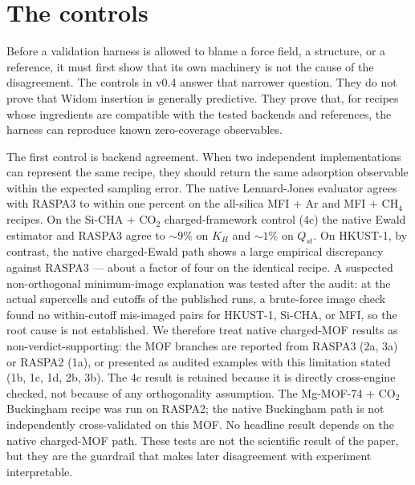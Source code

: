\section{The controls}\label{sec:controls}

Before a validation harness is allowed to blame a force field, a structure, or a reference, it must first show that its own machinery is not the cause of the disagreement. The controls in v0.4 answer that narrower question. They do not prove that Widom insertion is generally predictive. They prove that, for recipes whose ingredients are compatible with the tested backends and references, the harness can reproduce known zero-coverage observables.

The first control is backend agreement. When two independent implementations can represent the same recipe, they should return the same adsorption observable within the expected sampling error. The native Lennard-Jones evaluator agrees with RASPA3 to within one percent on the all-silica MFI + Ar and MFI + CH\(_4\) recipes. On the Si-CHA + CO\(_2\) charged-framework control (4c) the native Ewald estimator and RASPA3 agree to \(\sim\!9\%\) on \(K_H\) and \(\sim\!1\%\) on \(Q_{st}\). On HKUST-1, by contrast, the native charged-Ewald path shows a large empirical discrepancy against RASPA3 --- about a factor of four on the identical recipe. A suspected non-orthogonal minimum-image explanation was tested after the audit: at the actual supercells and cutoffs of the published runs, a brute-force image check found no within-cutoff mis-imaged pairs for HKUST-1, Si-CHA, or MFI, so the root cause is not established. We therefore treat native charged-MOF results as non-verdict-supporting: the MOF branches are reported from RASPA3 (2a, 3a) or RASPA2 (1a), or presented as audited examples with this limitation stated (1b, 1c, 1d, 2b, 3b). The 4c result is retained because it is directly cross-engine checked, not because of any orthogonality assumption. The Mg-MOF-74 + CO\(_2\) Buckingham recipe was run on RASPA2; the native Buckingham path is not independently cross-validated on this MOF. No headline result depends on the native charged-MOF path. These tests are not the scientific result of the paper, but they are the guardrail that makes later disagreement with experiment interpretable.

